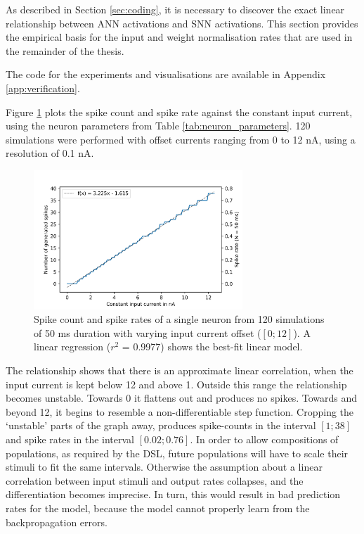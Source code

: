 
As described in Section \ref{sec:coding}, it is necessary to discover the exact
linear relationship between \gls{ANN} activations and \gls{SNN} activations. This section provides the empirical basis for the input and weight normalisation
rates that are used in the remainder of the thesis.

The code for the experiments and visualisations are available in
Appendix \ref{app:verification}.

Figure \ref{fig:spike_rates} plots the spike count and spike rate against the
constant input current, using the neuron parameters from Table \ref{tab:neuron_parameters}.
120 simulations were performed with offset currents ranging from 0 to 12 nA, 
using a resolution of 0.1 nA.

\begin{figure}
  \centering
  \includegraphics[width=0.7\textwidth]{images/spike_rate.png}
  \caption{Spike count and spike rates of a single neuron from 120 simulations of 50 ms
    duration with varying input current offset ($[0;12]$).
  A linear regression ($r^2$ = 0.9977) shows the best-fit linear model.}
  \label{fig:spike_rates}
\end{figure}

The relationship shows that there is an approximate linear correlation, when the
input current is kept below 12 and above 1. 
Outside this range the relationship becomes unstable. Towards 0 it flattens out and
produces no spikes. Towards and beyond 12, it begins to resemble a non-differentiable 
step function.
Cropping the `unstable' parts of the graph away, produces spike-counts in the interval
$[1;38]$ and spike rates in the interval $[0.02;0.76]$.
In order to allow compositions of populations, as required by the \gls{DSL},
future populations will have to scale their stimuli to fit the same intervals.
Otherwise the assumption about a linear correlation between input stimuli and
output rates collapses, and the differentiation becomes imprecise.
In turn, this would result in bad prediction rates for the model, because the model
cannot properly learn from the backpropagation errors.

